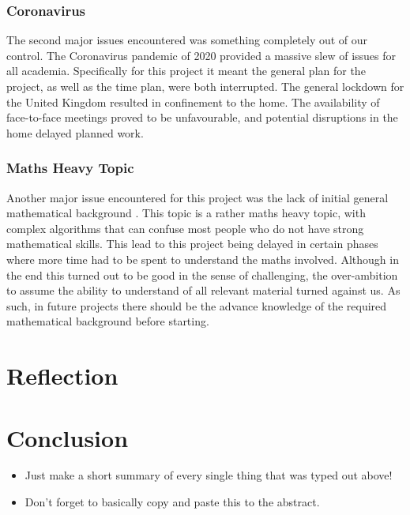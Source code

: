 \documentclass{article}
\begin{document}
\subsubsection{Coronavirus}
The second major issues encountered was something completely out of our control. The Coronavirus pandemic of 2020 provided a
massive slew of issues for all academia. Specifically for this project it meant the general plan for the project, as well as the
time plan, were both interrupted. The general lockdown for the United Kingdom resulted in confinement to the home. The
availability of face-to-face meetings proved to be unfavourable, and potential disruptions in the home delayed planned work.

\subsubsection{Maths Heavy Topic}
Another major issue encountered for this project was the lack of initial general mathematical background . This topic is a rather
maths heavy topic, with complex algorithms that can confuse most people who do not have strong mathematical skills. This lead to
this project being delayed in certain phases where more time had to be spent to understand the maths involved. Although in the end
this turned out to be good in the sense of challenging, the over-ambition to assume the ability to understand of all relevant
material turned against us. As such, in future projects there should be the advance knowledge of the required mathematical
background before starting.

\section{Reflection}


\section{Conclusion}
\begin{itemize}
    \item Just make a short summary of every single thing that was typed out above!
    \item Don't forget to basically copy and paste this to the abstract.
\end{itemize}

\newpage


\end{document}

